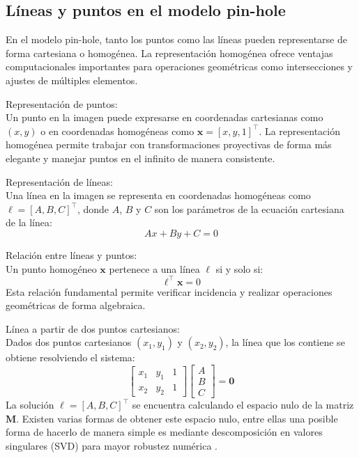 \subsection{Líneas y puntos en el modelo pin-hole}\label{subsec:lines-points}

En el modelo pin-hole, tanto los puntos como las líneas pueden representarse de forma cartesiana o homogénea. La representación homogénea ofrece ventajas computacionales importantes para operaciones geométricas como intersecciones y ajustes de múltiples elementos.

Representación de puntos:\\
Un punto en la imagen puede expresarse en coordenadas cartesianas como $(x,y)$ o en coordenadas homogéneas como $\mathbf{x}=[x,y,1]^\top$. La representación homogénea permite trabajar con transformaciones proyectivas de forma más elegante y manejar puntos en el infinito de manera consistente.

Representación de líneas:\\
Una línea en la imagen se representa en coordenadas homogéneas como $\ell=[A,B,C]^\top$, donde $A$, $B$ y $C$ son los parámetros de la ecuación cartesiana de la línea:
\begin{equation}
	Ax + By + C = 0
\end{equation}

Relación entre líneas y puntos:\\
Un punto homogéneo $\mathbf{x}$ pertenece a una línea $\ell$ si y solo si:
\begin{equation}
	\ell^\top\mathbf{x} = 0
\end{equation}
Esta relación fundamental permite verificar incidencia y realizar operaciones geométricas de forma algebraica.

Línea a partir de dos puntos cartesianos: \label{subsec:line-from-points} \\
Dados dos puntos cartesianos $(x_1,y_1)$ y $(x_2,y_2)$, la línea que los contiene se obtiene resolviendo el sistema:
\begin{equation}
	\begin{bmatrix}x_1&y_1&1\\x_2&y_2&1\end{bmatrix}\begin{bmatrix}A\\B\\C\end{bmatrix} = \mathbf{0}
\end{equation}
La solución $\ell=[A,B,C]^\top$ se encuentra calculando el espacio nulo de la matriz $\mathbf{M}$. Existen varias formas de obtener este espacio nulo, entre ellas una posible forma de hacerlo de manera simple es mediante descomposición en valores singulares (SVD) para mayor robustez numérica \cite{golub2013matrix}.

